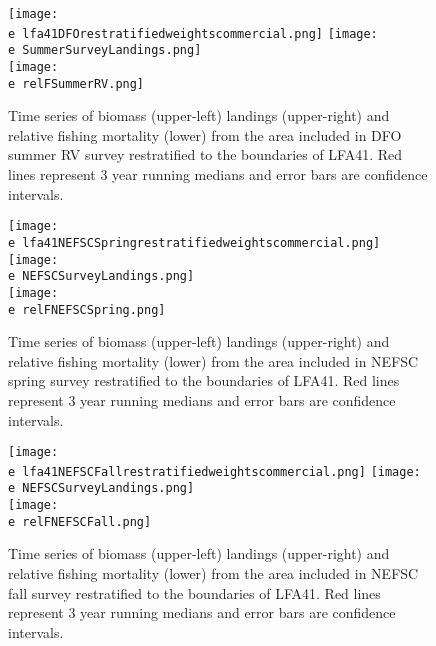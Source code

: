 \documentclass[11pt]{article}
\newcommand{\e}{/backup/bio_data/bio.lobster/figures/} %
\begin{document}
\clearpage




\begin{figure}

    \texttt{[image: \\e lfa41DFOrestratifiedweightscommercial.png]}
    \texttt{[image: \\e SummerSurveyLandings.png]} \\
    \texttt{[image: \\e relFSummerRV.png]} \\
    \caption{Time series of biomass (upper-left) landings (upper-right) and relative fishing mortality (lower) from the area included in DFO summer RV survey restratified to the boundaries of LFA41. Red lines represent 3 year running medians and error bars are confidence intervals.}

\end{figure}


\begin{figure}

    \texttt{[image: \\e lfa41NEFSCSpringrestratifiedweightscommercial.png]}
    \texttt{[image: \\e NEFSCSurveyLandings.png]} \\
    \texttt{[image: \\e relFNEFSCSpring.png]} \\
    \caption{Time series of biomass (upper-left) landings (upper-right) and relative fishing mortality (lower) from the area included in NEFSC spring survey restratified to the boundaries of LFA41. Red lines represent 3 year running medians and error bars are confidence intervals.}

\end{figure}


\begin{figure}

    \texttt{[image: \\e lfa41NEFSCFallrestratifiedweightscommercial.png]}
    \texttt{[image: \\e NEFSCSurveyLandings.png]} \\
    \texttt{[image: \\e relFNEFSCFall.png]} \\
    \caption{Time series of biomass (upper-left) landings (upper-right) and relative fishing mortality (lower) from the area included in NEFSC fall survey restratified to the boundaries of LFA41. Red lines represent 3 year running medians and error bars are confidence intervals.}

\end{figure}
\end{document}
